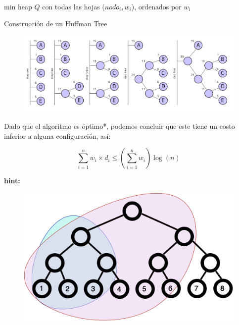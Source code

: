 \documentclass[12pt]{beamer}
\begin{document}
\begin{frame}
\hspace*{0.5cm} %
\begin{minipage}{0.9\textwidth}
\SetAlFnt{\footnotesize} %
\begin{algorithm}[H]
  min heap $Q$ con todas las hojas ($nodo_i, w_i$), ordenados por $w_i$\;
  \caption{Construcción de un Huffman Tree}
\end{algorithm}
\end{minipage}
\end{frame}

\begin{frame}
\begin{ejemplo}
\begin{figure}
    \centering
    \includegraphics[width=1\linewidth]{img/huffmanalgorithm.png}
    \label{fig:enter-label}
\end{figure}  
\end{ejemplo}    
\end{frame}

\begin{frame}
\begin{bloque}
Dado que el algoritmo es óptimo*, podemos concluir que este tiene un costo inferior a alguna configuración, así:

\[
\sum_{i=1}^n w_i \times d_i \le \left(\sum_{i=1}^n w_i\right) \log (n)
\]

\pause

\textbf{hint:}

\begin{figure}
    \centering
    \includegraphics[width=0.4\linewidth, height=0.23\textwidth]{img/complete.png}
    \label{fig:enter-label}
\end{figure}

\end{bloque}
\end{frame}
\end{document}
